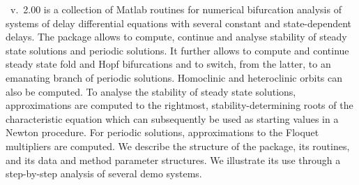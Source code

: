 {\DDEBIFCODE\ v.~2.00} is a collection of Matlab routines for numerical 
bifurcation
analysis of systems of delay differential equations with several constant
and state-dependent delays. The package allows to compute, 
continue and analyse stability of
steady state solutions and periodic solutions. 
It further allows to compute and
continue steady state fold and Hopf bifurcations and
to switch, from the latter, to an emanating branch of periodic
solutions.  Homoclinic and heteroclinic orbits can also be computed.
To analyse the stability of steady state solutions, 
approximations are computed to
the rightmost, stability-determining roots of the characteristic
equation which can sub\-sequently be used as starting values in a Newton
procedure.
For periodic solutions, approximations to the Floquet multipliers
are computed.
We describe the structure of the package, its routines,
and its data and method parameter structures.
We illustrate its use through a step-by-step analysis of several
demo systems.
 